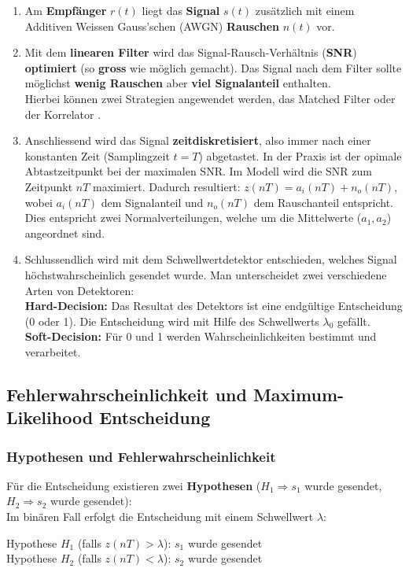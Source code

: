 \begin{enumerate}
  \item Am \textbf{Empfänger} $r(t)$ liegt das \textbf{Signal} $s(t)$ zusätzlich mit einem Additiven 
  		Weissen Gauss'schen (AWGN) \textbf{Rauschen} $n(t)$ vor.
  \item Mit dem \textbf{linearen Filter} wird das Signal-Rausch-Verhältnis (\textbf{SNR})
		\textbf{optimiert} (so \textbf{gross} wie möglich gemacht). Das Signal nach dem Filter sollte
		möglichst \textbf{wenig Rauschen} aber \textbf{viel Signalanteil} enthalten. \\
		Hierbei können zwei Strategien angewendet werden, das Matched Filter 
		 oder der Korrelator
		.
  \item Anschliessend wird das Signal \textbf{zeitdiskretisiert}, also immer nach einer konstanten Zeit
  		(Samplingzeit $t = T$) abgetastet. In der Praxis ist der opimale Abtastzeitpunkt bei der maximalen SNR. Im Modell wird die SNR zum Zeitpunkt $nT$ maximiert. Dadurch resultiert: $z(nT) = a_i(nT) + n_o(nT)$, wobei $a_i(nT)$
  		dem Signalanteil und $n_o(nT)$ dem Rauschanteil entspricht. \\
  		Dies entspricht zwei Normalverteilungen, welche um die Mittelwerte ($a_1, a_2$) angeordnet sind.
  \item Schlussendlich wird mit dem Schwellwertdetektor entschieden, welches Signal
  		höchstwahrscheinlich gesendet wurde. Man unterscheidet zwei verschiedene Arten von
  		Detektoren: \\ \textbf{Hard-Decision:} Das Resultat des Detektors ist eine endgültige
  		Entscheidung (0 oder 1). Die Entscheidung wird mit Hilfe des Schwellwerts $\lambda_0$ gefällt.\\ 
  		\textbf{Soft-Decision:} Für 0 und 1 werden Wahrscheinlichkeiten bestimmt und verarbeitet.
\end{enumerate}

\subsection{Fehlerwahrscheinlichkeit und Maximum-Likelihood Entscheidung }
\subsubsection{Hypothesen und Fehlerwahrscheinlichkeit}
	Für die Entscheidung existieren zwei \textbf{Hypothesen} ($H_1 \Rightarrow s_1$ wurde gesendet, 
	$H_2 \Rightarrow s_2$ wurde gesendet): \\ 
	Im binären Fall erfolgt die Entscheidung mit einem Schwellwert $\lambda$: \qquad \parbox[c]{10cm}{
	Hypothese $H_1$ (falls $z(nT) > \lambda$): \quad $s_1$ wurde gesendet \\
	Hypothese $H_2$ (falls $z(nT) < \lambda$): \quad $s_2$ wurde gesendet}\\

